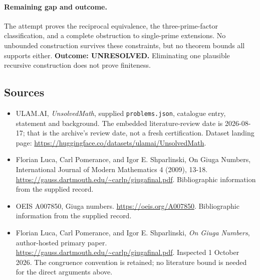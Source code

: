 \documentclass[11pt,a4paper]{article}
\begin{document}
\paragraph{Remaining gap and outcome.}
The attempt proves the reciprocal equivalence, the three-prime-factor
classification, and a complete obstruction to single-prime extensions.
No unbounded construction survives these constraints, but no theorem
bounds all supports either. \textbf{Outcome: UNRESOLVED.} Eliminating
one plausible recursive construction does not prove finiteness.

\subsection{Sources}

{\small

\begin{itemize}

\item[\hypertarget{source:statement:1}{S1}] ULAM.AI, \emph{UnsolvedMath}, supplied \texttt{problems.json}, catalogue entry, statement and background. The embedded literature-review date is 2026-08-17; that is the archive’s review date, not a fresh certification. Dataset landing page: \url{https://huggingface.co/datasets/ulamai/UnsolvedMath}.

\item[\hypertarget{source:statement:2}{S2}] Florian Luca, Carl Pomerance, and Igor E. Shparlinski, On Giuga Numbers, International Journal of Modern Mathematics 4 (2009), 13-18. \url{https://gauss.dartmouth.edu/~carlp/giugafinal.pdf}. Bibliographic information from the supplied record.

\item[\hypertarget{source:statement:3}{S3}] OEIS A007850, Giuga numbers. \url{https://oeis.org/A007850}. Bibliographic information from the supplied record.


\item[E1] Florian Luca, Carl Pomerance, and Igor E. Shparlinski,
\emph{On Giuga Numbers}, author-hosted primary paper.
\url{https://gauss.dartmouth.edu/~carlp/giugafinal.pdf}.
Inspected 1 October 2026. The congruence convention is retained; no
literature bound is needed for the direct arguments above.

\end{itemize}

}

\label{end:statement}
\end{document}
